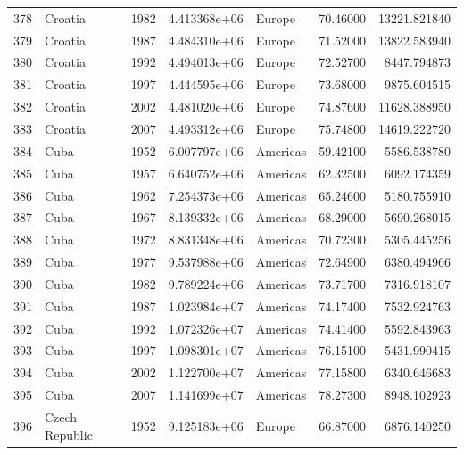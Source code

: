 \documentclass[
  letterpaper,
  DIV=11,
  numbers=noendperiod]{scrreprt}
\begin{document}
\begin{tabular}{llrrlrr}
378  &                   Croatia &  1982 &  4.413368e+06 &    Europe &  70.46000 &   13221.821840 \\
379  &                   Croatia &  1987 &  4.484310e+06 &    Europe &  71.52000 &   13822.583940 \\
380  &                   Croatia &  1992 &  4.494013e+06 &    Europe &  72.52700 &    8447.794873 \\
381  &                   Croatia &  1997 &  4.444595e+06 &    Europe &  73.68000 &    9875.604515 \\
382  &                   Croatia &  2002 &  4.481020e+06 &    Europe &  74.87600 &   11628.388950 \\
383  &                   Croatia &  2007 &  4.493312e+06 &    Europe &  75.74800 &   14619.222720 \\
384  &                      Cuba &  1952 &  6.007797e+06 &  Americas &  59.42100 &    5586.538780 \\
385  &                      Cuba &  1957 &  6.640752e+06 &  Americas &  62.32500 &    6092.174359 \\
386  &                      Cuba &  1962 &  7.254373e+06 &  Americas &  65.24600 &    5180.755910 \\
387  &                      Cuba &  1967 &  8.139332e+06 &  Americas &  68.29000 &    5690.268015 \\
388  &                      Cuba &  1972 &  8.831348e+06 &  Americas &  70.72300 &    5305.445256 \\
389  &                      Cuba &  1977 &  9.537988e+06 &  Americas &  72.64900 &    6380.494966 \\
390  &                      Cuba &  1982 &  9.789224e+06 &  Americas &  73.71700 &    7316.918107 \\
391  &                      Cuba &  1987 &  1.023984e+07 &  Americas &  74.17400 &    7532.924763 \\
392  &                      Cuba &  1992 &  1.072326e+07 &  Americas &  74.41400 &    5592.843963 \\
393  &                      Cuba &  1997 &  1.098301e+07 &  Americas &  76.15100 &    5431.990415 \\
394  &                      Cuba &  2002 &  1.122700e+07 &  Americas &  77.15800 &    6340.646683 \\
395  &                      Cuba &  2007 &  1.141699e+07 &  Americas &  78.27300 &    8948.102923 \\
396  &            Czech Republic &  1952 &  9.125183e+06 &    Europe &  66.87000 &    6876.140250 \\

\end{tabular}
\end{document}
